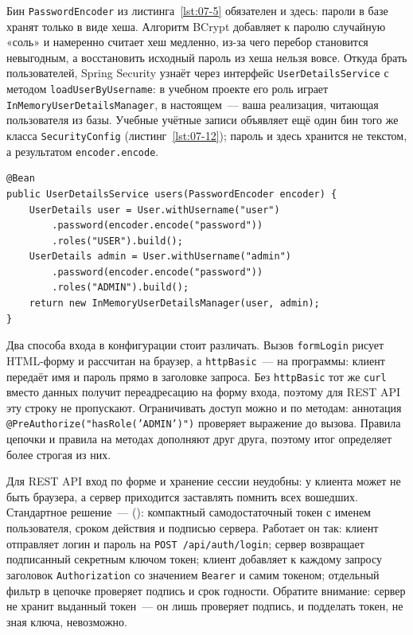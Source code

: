 Бин \texttt{PasswordEncoder} из листинга~\ref{lst:07-5} обязателен и здесь:
пароли в базе хранят только в виде хеша. Алгоритм BCrypt добавляет к паролю случайную «соль» и намеренно считает
хеш медленно, из-за чего перебор становится невыгодным, а восстановить
исходный пароль из хеша нельзя вовсе. Откуда брать пользователей, Spring
Security узнаёт через интерфейс \texttt{UserDetailsService} с методом
\texttt{loadUserByUsername}: в учебном проекте его роль играет
\texttt{InMemoryUserDetailsManager}, в настоящем~--- ваша реализация, читающая
пользователя из базы. Учебные учётные записи объявляет ещё один бин того же
класса \texttt{SecurityConfig} (листинг~\ref{lst:07-12}); пароль и здесь
хранится не текстом, а результатом \texttt{encoder.encode}.

\begin{listing}[H]
\begin{verbatim}
@Bean
public UserDetailsService users(PasswordEncoder encoder) {
    UserDetails user = User.withUsername("user")
        .password(encoder.encode("password"))
        .roles("USER").build();
    UserDetails admin = User.withUsername("admin")
        .password(encoder.encode("password"))
        .roles("ADMIN").build();
    return new InMemoryUserDetailsManager(user, admin);
}
\end{verbatim}
\caption{Два пользователя в памяти приложения}
\label{lst:07-12}
\end{listing}

Два способа входа в конфигурации стоит различать. Вызов
\texttt{formLogin} рисует HTML-форму и рассчитан на браузер, а
\texttt{httpBasic}~--- на программы: клиент передаёт имя и пароль прямо в
заголовке запроса. Без \texttt{httpBasic} тот же \texttt{curl} вместо
данных получит переадресацию на форму входа, поэтому для REST API эту
строку не пропускают. Ограничивать доступ можно и по методам: аннотация
\texttt{@PreAuthorize("hasRole('ADMIN')")} проверяет выражение до вызова.
Правила цепочки и правила на методах дополняют друг друга, поэтому итог
определяет более строгая из них.

Для REST API вход по форме и хранение сессии неудобны: у клиента может не
быть браузера, а сервер приходится заставлять помнить всех вошедших.
Стандартное решение~---  (): компактный
самодостаточный токен с именем пользователя, сроком действия и подписью
сервера. Работает он так: клиент отправляет логин и пароль на
\texttt{POST /api/auth/login}; сервер возвращает подписанный секретным ключом
токен; клиент добавляет к каждому запросу заголовок \texttt{Authorization} со
значением \texttt{Bearer} и самим токеном; отдельный фильтр в цепочке
проверяет подпись и срок годности. Обратите внимание: сервер не хранит
выданный токен~--- он лишь проверяет подпись, и подделать токен, не зная
ключа, невозможно.

